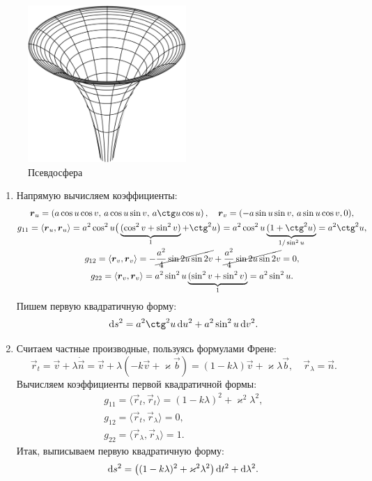 \begin{figure}[H]
	\centering
	\includegraphics[width=6cm]{./img/Pseudosphere.pdf}
	\caption{Псевдосфера}
\end{figure}

\begin{solution}
	\begin{enumerate}[nolistsep, label=(\arabic*)]
		\item Напрямую вычисляем коэффициенты\footnotemark:
			\begin{gather*}
				\vec{r}_u = \br{a\cos u\cos v,\,a\cos u\sin v,\,a\ctg u\cos u},\quad \vec{r}_v = (-a\sin u\sin v,\,a\sin u\cos v, 0),\\
				g_{11} = \langle\vec{r}_u, \vec{r}_u\rangle = a^2\cos^2u\big(\underbrace{(\cos^2v + \sin^2v)}_1 + \ctg^2u\big) = a^2\cos^2u\underbrace{(1 + \ctg^2u)}_{1 / \sin^2u} = a^2\ctg^2u,\\
				g_{12} = \langle\vec{r}_v, \vec{r}_v\rangle = -\cancel{\frac{a^2}{4}\sin2u\sin2v} + \cancel{\frac{a^2}{4}\sin2u\sin2v} = 0,\\
				g_{22} = \langle\vec{r}_v, \vec{r}_v\rangle = a^2\sin^2u\underbrace{(\sin^2v + \sin^2v)}_1 = a^2\sin^2u.
			\end{gather*}%
			Пишем первую квадратичную форму:
			\[
				\d s^2 = a^2\ctg^2u\d u^2 + a^2\sin^2u\d v^2.
			\]
		\item Считаем частные производные, пользуясь формулами Френе:
			\[
				\vec{r}_t = \vec{v} + \lambda\dot{\vec{n}} = \vec{v} + \lambda(-k\vec{v} + \varkappa\vec{b}) = (1 - k\lambda)\vec{v} + \varkappa\lambda\vec{b},\quad \vec{r}_\lambda = \vec{n}.
			\]
			Вычисляем коэффициенты первой квадратичной формы:
			\begin{gather*}
				g_{11} = \langle\vec{r}_t, \vec{r}_t\rangle = (1 - k\lambda)^2 + \varkappa^2\lambda^2,\\
				g_{12} = \langle\vec{r}_t, \vec{r}_\lambda\rangle = 0,\\
				g_{22} = \langle\vec{r}_\lambda, \vec{r}_\lambda\rangle = 1.
			\end{gather*}
			Итак, выписываем первую квадратичную форму:
			\[
				\mathop{}\!\mathrm{d} s^2 = \big((1 - k\lambda)^2 + \varkappa^2\lambda^2\big)\mathop{}\!\mathrm{d} t^2 + \mathop{}\!\mathrm{d}\lambda^2.
			\]
	\end{enumerate}
\end{solution}

